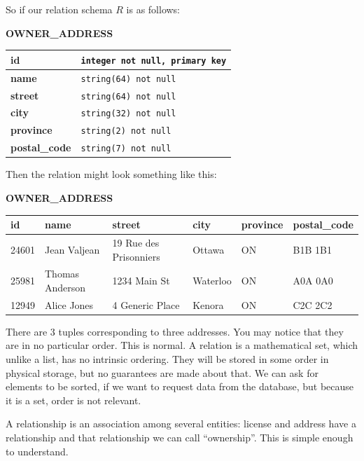So if our relation schema $R$ is as follows:
\begin{center}
		\textbf{OWNER\_ADDRESS}\\
	\begin{tabular}{|l|l|}\hline
		\textbf{id} & \texttt{integer not null,  primary key}\\ \hline
		\textbf{name} & \texttt{string(64) not null}\\ \hline
		\textbf{street} & \texttt{string(64) not null}\\ \hline
		\textbf{city} & \texttt{string(32) not null}\\ \hline
		\textbf{province} & \texttt{string(2) not null}\\ \hline
		\textbf{postal\_code} & \texttt{string(7) not null}\\ \hline

	\end{tabular}
\end{center}

Then the relation might look something like this:
\begin{center}
		\textbf{OWNER\_ADDRESS}\\
	\begin{tabular}{|l|l|l|l|l|l|}\hline
		\textbf{id} & \textbf{name} &\textbf{street} & \textbf{city} & \textbf{province} & \textbf{postal\_code} \\ \hline
		24601 & Jean Valjean & 19 Rue des Prisonniers & Ottawa & ON & B1B 1B1\\ \hline
		25981 & Thomas Anderson & 1234 Main St & Waterloo & ON & A0A 0A0\\ \hline
		12949 & Alice Jones & 4 Generic Place & Kenora & ON & C2C 2C2\\ \hline
	\end{tabular}
\end{center}

There are 3 tuples corresponding to three addresses. You may notice that they are in no particular order. This is normal. A relation is a mathematical set, which unlike a list, has no intrinsic ordering. They will be stored in some order in physical storage, but no guarantees are made about that. We can ask for elements to be sorted, if we want to request data from the database, but because it is a set, order is not relevant.

A relationship is an association among several entities: license and address have a relationship and that relationship we can call ``ownership''. This is simple enough to understand.

